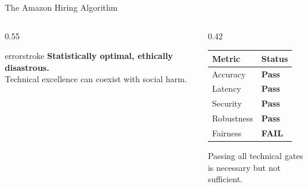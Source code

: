 \documentclass[aspectratio=169, 12pt]{beamer}
\begin{document}
\begin{frame}{The Amazon Hiring Algorithm}
\begin{columns}[T]
\begin{column}{0.55\textwidth}
    \vspace{0.1cm}
    \begin{mlsyscard}{errorstroke}
    \textbf{Statistically optimal, ethically disastrous.}\\
    {\footnotesize Technical excellence can coexist with social harm.}
    \end{mlsyscard}
  \end{column}
  \begin{column}{0.42\textwidth}
    \vspace{0.3cm}
    \renewcommand{\arraystretch}{1.25}
    {\footnotesize
    \begin{tabular}{@{}ll@{}}
      \toprule
      \textbf{Metric} & \textbf{Status} \\
      \midrule
      Accuracy     & \textcolor{datastroke}{\textbf{Pass}} \\
      Latency      & \textcolor{datastroke}{\textbf{Pass}} \\
      Security     & \textcolor{datastroke}{\textbf{Pass}} \\
      Robustness   & \textcolor{datastroke}{\textbf{Pass}} \\
      \midrule
      Fairness     & \textcolor{errorstroke}{\textbf{FAIL}} \\
      \bottomrule
    \end{tabular}
    }

    \vspace{0.15cm}
    {\footnotesize\textcolor{midgray}{Passing all technical gates\\is necessary but not sufficient.}}
  \end{column}
\end{columns}

\end{frame}
\end{document}
